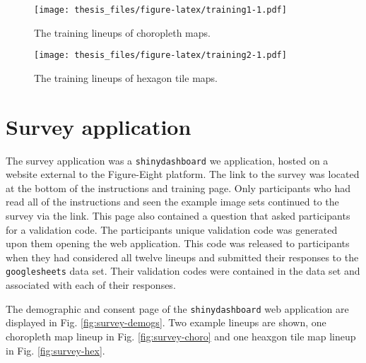 \documentclass{monashthesis}
\begin{document}
\begin{figure}
\centering
\texttt{[image: thesis\_files/figure-latex/training1-1.pdf]}
\caption{\label{fig:training1}The training lineups of choropleth maps.}
\end{figure}

\begin{Shaded}
\begin{Highlighting}[]
\NormalTok{() }\OperatorTok{+}
\StringTok{  }\OperatorTok{::}\NormalTok{(}\NormalTok{(}\NormalTok{)))}
\end{Highlighting}
\end{Shaded}

\begin{figure}
\centering
\texttt{[image: thesis\_files/figure-latex/training2-1.pdf]}
\caption{\label{fig:training2}The training lineups of hexagon tile maps.}
\end{figure}

\hypertarget{survey-application}{%
\section{Survey application}\label{survey-application}}

The survey application was a \texttt{shinydashboard} we application, hosted on a website external to the Figure-Eight platform. The link to the survey was located at the bottom of the instructions and training page. Only participants who had read all of the instructions and seen the example image sets continued to the survey via the link.
This page also contained a question that asked participants for a validation code. The participants unique validation code was generated upon them opening the web application. This code was released to participants when they had considered all twelve lineups and submitted their responses to the \texttt{googlesheets} data set. Their validation codes were contained in the data set and associated with each of their responses.

The demographic and consent page of the \texttt{shinydashboard} web application are displayed in Fig. \ref{fig:survey-demogs}. Two example lineups are shown, one choropleth map lineup in Fig. \ref{fig:survey-choro} and one heaxgon tile map lineup in Fig. \ref{fig:survey-hex}.

\begin{Shaded}
\begin{Highlighting}[]
\NormalTok{() }\OperatorTok{+}
\StringTok{  }\OperatorTok{::}\NormalTok{(}\NormalTok{(}\NormalTok{)))}
\end{Highlighting}
\end{Shaded}
\end{document}
